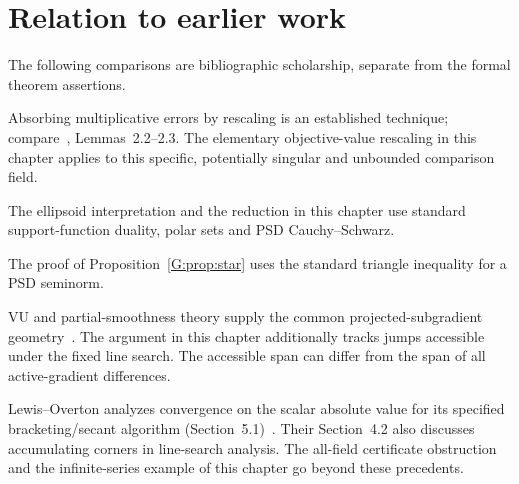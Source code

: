 \endgroup


\section*{Relation to earlier work}
The following comparisons are bibliographic scholarship, separate from the formal theorem assertions.

Absorbing multiplicative errors by rescaling is an established technique; compare~\cite{FND_CV13}, Lemmas~2.2--2.3. The elementary objective-value rescaling in this chapter applies to this specific, potentially singular and unbounded comparison field.

The ellipsoid interpretation and the reduction in this chapter use standard support-function duality, polar sets and PSD Cauchy--Schwarz.

The proof of Proposition~\ref{G:prop:star} uses the standard triangle inequality for a PSD seminorm.

VU and partial-smoothness theory supply the common projected-subgradient geometry~\cite{geom_Lewis2002,LL}. The argument in this chapter additionally tracks jumps accessible under the fixed line search. The accessible span can differ from the span of all active-gradient differences.

Lewis--Overton analyzes convergence on the scalar absolute value for its specified bracketing/secant algorithm (Section~5.1)~\cite{LO}. Their Section~4.2 also discusses accumulating corners in line-search analysis. The all-field certificate obstruction and the infinite-series example of this chapter go beyond these precedents.
